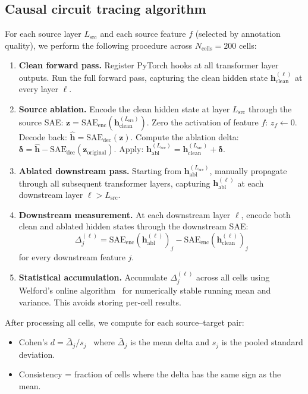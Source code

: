 \documentclass[onecolumn]{article}
\begin{document}
\subsection{Causal circuit tracing algorithm}

For each source layer $L_\text{src}$ and each source feature $f$ (selected by annotation quality), we perform the following procedure across $N_\text{cells} = 200$ cells:

\begin{enumerate}
\item \textbf{Clean forward pass.} Register PyTorch hooks at all transformer layer outputs. Run the full forward pass, capturing the clean hidden state $\mathbf{h}^{(\ell)}_\text{clean}$ at every layer $\ell$.

\item \textbf{Source ablation.} Encode the clean hidden state at layer $L_\text{src}$ through the source SAE: $\mathbf{z} = \text{SAE}_\text{enc}(\mathbf{h}^{(L_\text{src})}_\text{clean})$. Zero the activation of feature $f$: $z_f \gets 0$. Decode back: $\hat{\mathbf{h}} = \text{SAE}_\text{dec}(\mathbf{z})$. Compute the ablation delta: $\boldsymbol{\delta} = \hat{\mathbf{h}} - \text{SAE}_\text{dec}(\mathbf{z}_\text{original})$. Apply: $\mathbf{h}^{(L_\text{src})}_\text{abl} = \mathbf{h}^{(L_\text{src})}_\text{clean} + \boldsymbol{\delta}$.

\item \textbf{Ablated downstream pass.} Starting from $\mathbf{h}^{(L_\text{src})}_\text{abl}$, manually propagate through all subsequent transformer layers, capturing $\mathbf{h}^{(\ell)}_\text{abl}$ at each downstream layer $\ell > L_\text{src}$.

\item \textbf{Downstream measurement.} At each downstream layer $\ell$, encode both clean and ablated hidden states through the downstream SAE:
\[
\Delta_j^{(\ell)} = \text{SAE}_\text{enc}(\mathbf{h}^{(\ell)}_\text{abl})_j - \text{SAE}_\text{enc}(\mathbf{h}^{(\ell)}_\text{clean})_j
\]
for every downstream feature $j$.

\item \textbf{Statistical accumulation.} Accumulate $\Delta_j^{(\ell)}$ across all cells using Welford's online algorithm~\citep{welford1962note} for numerically stable running mean and variance. This avoids storing per-cell results.
\end{enumerate}

After processing all cells, we compute for each source--target pair:
\begin{itemize}
\item Cohen's $d = \bar{\Delta}_j / s_j$~\citep{cohen1988statistical} where $\bar{\Delta}_j$ is the mean delta and $s_j$ is the pooled standard deviation.
\item Consistency = fraction of cells where the delta has the same sign as the mean.
\end{itemize}
\end{document}
